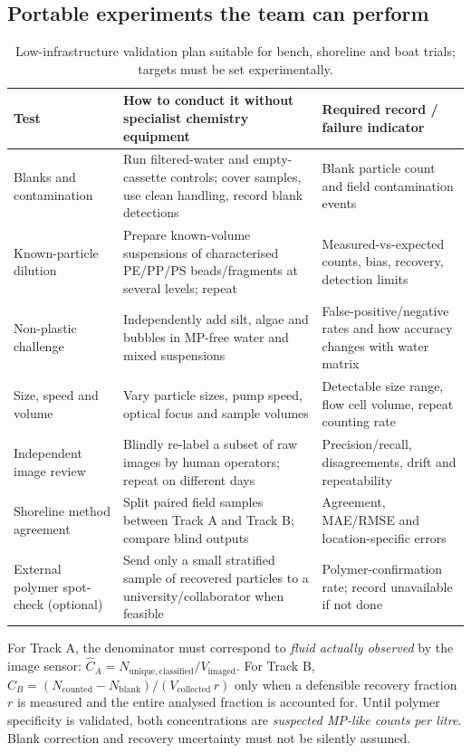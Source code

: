\documentclass[10pt,a4paper]{article}
\begin{document}
\subsection{Portable experiments the team can perform}
\begin{table}[H]\centering\footnotesize
\caption{Low-infrastructure validation plan suitable for bench, shoreline and boat trials; targets must be set experimentally.}\label{tab:verification}
\begin{tabularx}{\linewidth}{@{}p{2.7cm}X X@{}}\toprule
Test & How to conduct it without specialist chemistry equipment & Required record / failure indicator \\\midrule
Blanks and contamination & Run filtered-water and empty-cassette controls; cover samples, use clean handling, record blank detections & Blank particle count and field contamination events \\
Known-particle dilution & Prepare known-volume suspensions of characterised PE/PP/PS beads/fragments at several levels; repeat & Measured-vs-expected counts, bias, recovery, detection limits \\
Non-plastic challenge & Independently add silt, algae and bubbles in MP-free water and mixed suspensions & False-positive/negative rates and how accuracy changes with water matrix \\
Size, speed and volume & Vary particle sizes, pump speed, optical focus and sample volumes & Detectable size range, flow cell volume, repeat counting rate \\
Independent image review & Blindly re-label a subset of raw images by human operators; repeat on different days & Precision/recall, disagreements, drift and repeatability \\
Shoreline method agreement & Split paired field samples between Track A and Track B; compare blind outputs & Agreement, MAE/RMSE and location-specific errors \\
External polymer spot-check (optional) & Send only a small stratified sample of recovered particles to a university/collaborator when feasible & Polymer-confirmation rate; record unavailable if not done \\
\bottomrule\end{tabularx}
\end{table}

For Track A, the denominator must correspond to \emph{fluid actually observed} by the image sensor: $\widehat{C}_{A}=N_{\mathrm{unique,classified}}/V_{\mathrm{imaged}}$. For Track B, $\widehat{C}_{B}=(N_{\mathrm{counted}}-N_{\mathrm{blank}})/(V_{\mathrm{collected}}\,r)$ only when a defensible recovery fraction $r$ is measured and the entire analysed fraction is accounted for. Until polymer specificity is validated, both concentrations are \emph{suspected MP-like counts per litre}. Blank correction and recovery uncertainty must not be silently assumed.
\end{document}
